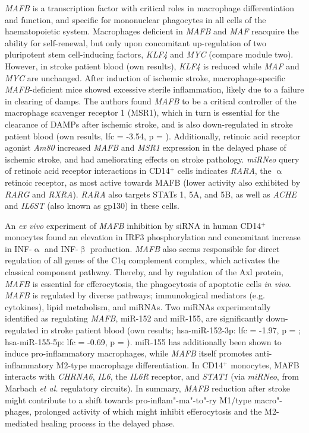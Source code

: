 \emph{MAFB} is a transcription factor with critical roles in macrophage differentiation and function, and specific for mononuclear phagocytes in all cells of the haematopoietic system.\cite{Hamada2020} Macrophages deficient in \emph{MAFB} and \emph{MAF} reacquire the ability for self-renewal, but only upon concomitant up-regulation of two pluripotent stem cell-inducing factors, \emph{KLF4} and \emph{MYC} (compare module two).\cite{Aziz2009} However, in stroke patient blood (own results), \emph{KLF4} is reduced while \emph{MAF} and \emph{MYC} are unchanged. After induction of ischemic stroke, macrophage-specific \emph{MAFB}-deficient mice showed excessive sterile inflammation, likely due to a failure in clearing of \acp{damp}.\cite{Shichita2017} The authors found \emph{MAFB} to be a critical controller of the macrophage scavenger receptor 1 (MSR1), which in turn is essential for the clearance of DAMPs after ischemic stroke, and is also down-regulated in stroke patient blood (own results, \ac{lfc} = -3.54, p = ). Additionally, retinoic acid receptor agonist \emph{Am80} increased \emph{MAFB} and \emph{MSR1} expression in the delayed phase of ischemic stroke, and had ameliorating effects on stroke pathology.\cite{Shichita2017} \emph{miRNeo} query of retinoic acid receptor interactions in CD14$^+$ cells indicates \emph{RARA}, the $\upalpha$ retinoic receptor, as most active towards MAFB (lower activity also exhibited by \emph{RARG} and \emph{RXRA}). \emph{RARA} also targets STATs 1, 5A, and 5B, as well as \emph{ACHE} and \emph{IL6ST} (also known as gp130) in these cells. 

An \emph{ex vivo} experiment of \emph{MAFB} inhibition by siRNA in human CD14$^+$ monocytes found an elevation in IRF3 phosphorylation and concomitant increase in INF-$\upalpha$ and INF-$\upbeta$ production.\cite{Liu2019} \emph{MAFB} also seems responsible for direct regulation of all genes of the C1q complement complex, which activates the classical component pathway.\cite{Tran2017} Thereby, and by regulation of the Axl protein, \emph{MAFB} is essential for efferocytosis, the phagocytosis of apoptotic cells \emph{in vivo}.\cite{Sato2018} \emph{MAFB} is regulated by diverse pathways; immunological mediators (e.g. cytokines), lipid metabolism, and miRNAs.\cite{Hamada2020} Two miRNAs experimentally identified as regulating \emph{MAFB}, miR-152\cite{Tozaki-Saitoh2019} and miR-155\cite{Jablonski2016}, are significantly down-regulated in stroke patient blood (own results; hsa-miR-152-3p: \ac{lfc} = -1.97, p = ; hsa-miR-155-5p: \ac{lfc} = -0.69, p = ). miR-155 has additionally been shown to induce pro-inflammatory macrophages, while \emph{MAFB} itself promotes anti-inflammatory M2-type macrophage differentiation.\cite{Kim2017} In CD14$^+$ monocytes, MAFB interacts with \emph{CHRNA6}, \emph{IL6}, the \emph{IL6R} receptor, and \emph{STAT1} (via \emph{miRNeo}, from Marbach \emph{et al.}\cite{Marbach2016} regulatory circuits). In summary, \emph{MAFB} reduction after stroke might contribute to a shift towards pro-inflam"-ma"-to"-ry M1\-/type macro"-phages, prolonged activity of which might inhibit efferocytosis and the M2-mediated healing process in the delayed phase.

